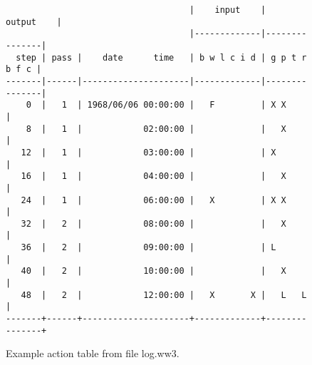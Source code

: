 \begin{figure}
{\small \begin{verbatim}
                                    |    input    |     output    |
                                    |-------------|---------------|
  step | pass |    date      time   | b w l c i d | g p t r b f c |
-------|------|---------------------|-------------|---------------|
    0  |   1  | 1968/06/06 00:00:00 |   F         | X X           |
    8  |   1  |            02:00:00 |             |   X           |
   12  |   1  |            03:00:00 |             | X             |
   16  |   1  |            04:00:00 |             |   X           |
   24  |   1  |            06:00:00 |   X         | X X           |
   32  |   2  |            08:00:00 |             |   X           |
   36  |   2  |            09:00:00 |             | L             |
   40  |   2  |            10:00:00 |             |   X           |
   48  |   2  |            12:00:00 |   X       X |   L   L       |
-------+------+---------------------+-------------+---------------+ 
\end{verbatim} }
\caption{Example action table from file {\file log.ww3}.} \label{fig:log}
\botline
\end{figure}
